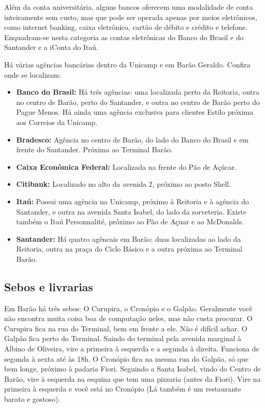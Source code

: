 Além da conta universitária, alguns bancos oferecem uma modalidade de conta
inteiramente sem custo, mas que pode ser operada apenas por meios eletrônicos,
como internet banking, caixa eletrônico, cartão de débito e crédito e telefone.
Enquadram-se nesta categoria as contas eletrônicas do Banco do Brasil e do
Santander e a iConta do Itaú.

Há várias agências bancárias dentro da Unicamp e em Barão Geraldo. Confira onde
se localizam:

\begin{itemize}
    \item  \textbf{Banco do Brasil:} Há três agências: uma localizada perto da
        Reitoria, outra no centro de Barão, perto do Santander, e outra no
        centro de Barão perto do Pague Menos. Há ainda uma agência exclusiva
        para clientes Estilo próxima aos Correios da Unicamp.

    \item  \textbf{Bradesco:} Agência no centro de Barão, do lado do Banco do
        Brasil e em frente do Santander. Próxima ao Terminal Barão.

    \item  \textbf{Caixa Econômica Federal:} Localizada na frente do Pão de
        Açúcar.

    \item  \textbf{Citibank:} Localizado no alto da avenida 2, próximo ao posto
        Shell.

    \item  \textbf{Itaú:} Possui uma agência na Unicamp, próximo à Reitoria e à
        agência do Santander, e outra na avenida Santa Isabel, do lado da
        sorveteria. Existe também o Itaú Personnalité, próximo ao Pão de Açuar e
        ao McDonalds.

    \item  \textbf{Santander:} Há quatro agêncais em Barão: duas localizadas ao
        lado da Reitoria, outra na praça do Ciclo Básico e a outra próxima ao
        Terminal Barão.
\end{itemize}

\subsection{Sebos e livrarias}

Em Barão há três sebos: O Curupira, o Cronópio e o Galpão. Geralmente você não
encontra muita coisa boa de computação neles, mas não custa procurar. O Curupira
fica na rua do Terminal, bem em frente a ele. Não é difícil achar. O Galpão fica
perto do Terminal. Saindo do terminal pela avenida marginal à Albino de
Oliveira, vire a primeira à esquerda e a segunda à direita. Funciona de segunda
à sexta até às 18h. O Cronópio fica na mesma rua do Galpão, só que bem longe,
próximo à padaria Fiori. Seguindo a Santa Isabel, vindo do Centro de Barão, vire
à esquerda na esquina que tem uma pizzaria (antes da Fiori). Vire na primeira à
esquerda e você está no Cronópio (Lá também é um restaurante barato e gostoso).


